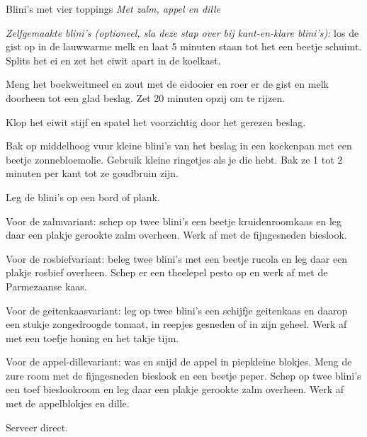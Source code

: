 \begin{recipe}{Blini's met vier toppings}
\medskip
\noindent\textit{Met zalm, appel en dille}
\begin{ingredients}
\end{ingredients}

\begin{steps}
  \item \textit{Zelfgemaakte blini's (optioneel, sla deze stap over bij
        kant-en-klare blini's):} los de gist op in de lauwwarme melk en laat
        5 minuten staan tot het een beetje schuimt. Splits het ei en zet het
        eiwit apart in de koelkast.
  \item Meng het boekweitmeel en zout met de eidooier en roer er de gist en
        melk doorheen tot een glad beslag. Zet 20 minuten opzij om te rijzen.
  \item Klop het eiwit stijf en spatel het voorzichtig door het gerezen
        beslag.
  \item Bak op middelhoog vuur kleine blini's van het beslag in een
        koekenpan met een beetje zonnebloemolie. Gebruik kleine ringetjes als
        je die hebt. Bak ze 1 tot 2 minuten per kant tot ze goudbruin zijn.
  \item Leg de blini's op een bord of plank.
  \item Voor de zalmvariant: schep op twee blini's een beetje kruidenroomkaas
        en leg daar een plakje gerookte zalm overheen. Werk af met de
        fijngesneden bieslook.
  \item Voor de rosbiefvariant: beleg twee blini's met een beetje rucola en
        leg daar een plakje rosbief overheen. Schep er een theelepel pesto
        op en werk af met de Parmezaanse kaas.
  \item Voor de geitenkaasvariant: leg op twee blini's een schijfje geitenkaas
        en daarop een stukje zongedroogde tomaat, in reepjes gesneden of
        in zijn geheel. Werk af met een toefje honing en het takje tijm.
  \item Voor de appel-dillevariant: was en snijd de appel in piepkleine
        blokjes. Meng de zure room met de fijngesneden bieslook en een
        beetje peper. Schep op twee blini's een toef bieslookroom en leg
        daar een plakje gerookte zalm overheen. Werk af met de appelblokjes
        en dille.
  \item Serveer direct.
\end{steps}
\end{recipe}

